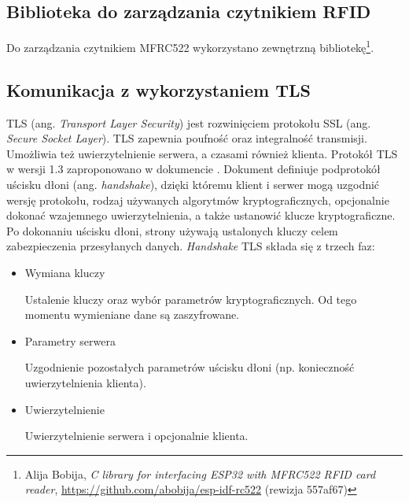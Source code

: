         \subsection{Biblioteka do zarządzania czytnikiem RFID}
        \label{sub:rfid_lib}

            Do zarządzania czytnikiem MFRC522 wykorzystano zewnętrzną bibliotekę\footnote{Alija Bobija, \textit{C library for interfacing ESP32 with MFRC522 RFID card reader}, \url{https://github.com/abobija/esp-idf-rc522} (rewizja 557af67)}.

        \subsection{Komunikacja z wykorzystaniem TLS}
        \label{sub:tls}

            TLS (ang. \textit{Transport Layer Security}) jest rozwinięciem protokołu SSL (ang. \textit{Secure Socket Layer}). TLS zapewnia poufność oraz integralność transmisji. Umożliwia też uwierzytelnienie serwera, a czasami również klienta.
            Protokół TLS w wersji 1.3 zaproponowano w dokumencie \cite{rfc8446}. Dokument definiuje podprotokół uścisku dłoni (ang. \textit{handshake}), dzięki któremu klient i serwer mogą uzgodnić wersję protokołu, rodzaj używanych algorytmów kryptograficznych, opcjonalnie dokonać wzajemnego uwierzytelnienia, a także ustanowić klucze kryptograficzne. Po dokonaniu uścisku dłoni, strony używają ustalonych kluczy celem zabezpieczenia przesyłanych danych.
            \textit{Handshake} TLS składa się z trzech faz:

            \begin{itemize}

                \item Wymiana kluczy

                    Ustalenie kluczy oraz wybór parametrów kryptograficznych. Od tego momentu wymieniane dane są zaszyfrowane.

                \item Parametry serwera

                    Uzgodnienie pozostałych parametrów uścisku dłoni (np. konieczność uwierzytelnienia klienta).

                \item Uwierzytelnienie

                    Uwierzytelnienie serwera i opcjonalnie klienta.
            \end{itemize}

